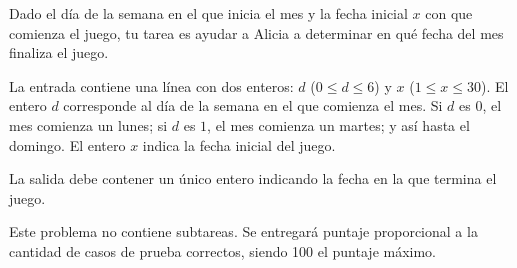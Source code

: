 \documentclass{oci}
\begin{document}
\begin{problemDescription}
  \begin{center}
  \end{center}

  Dado el día de la semana en el que inicia el mes y la fecha inicial $x$ con que comienza
  el juego, tu tarea es ayudar a Alicia a determinar en qué fecha del mes finaliza el juego.
\end{problemDescription}

\begin{inputDescription}
  La entrada contiene una línea con dos enteros: $d$ ($0 \leq d \leq 6$) y $x$ ($1 \leq x \leq 30$).
  El entero $d$ corresponde al día de la semana en el que comienza el mes.
  Si $d$ es $0$, el mes comienza un lunes; si $d$ es $1$, el mes comienza un martes; y así hasta el domingo.
  El entero $x$ indica la fecha inicial del juego.
\end{inputDescription}

\begin{outputDescription}
  La salida debe contener un único entero indicando la fecha en la que termina el juego.
\end{outputDescription}

\begin{scoreDescription}
  Este problema no contiene subtareas. Se entregará puntaje proporcional a la cantidad de casos
  de prueba correctos, siendo 100 el puntaje máximo.
\end{scoreDescription}

\begin{sampleDescription}
\end{sampleDescription}
\end{document}
